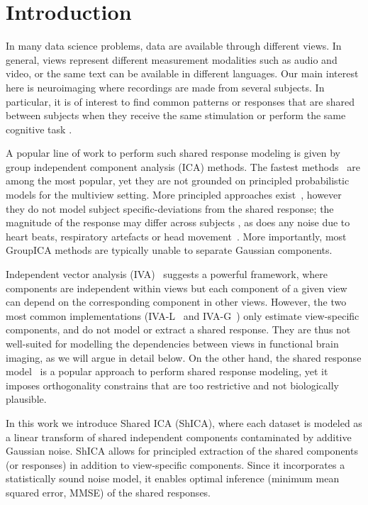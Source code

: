 \section{Introduction}
In many data science problems, data are available through different views. In general, views represent different measurement modalities such as audio and video, or the same text can be available in different languages. Our main interest here is neuroimaging where recordings are made from several subjects. In particular, it is of interest to find common patterns or responses that are shared between subjects when they receive the same stimulation or perform the same cognitive task \citep{chen2015reduced,richard2020modeling}. 

A popular line of work to perform such shared response modeling is given by group independent component analysis (ICA) methods. The fastest methods~\cite{calhoun2001method, varoquaux2009canica} are among the most popular, yet they are not grounded on principled probabilistic models for the multiview setting. 
%
More principled approaches exist~\cite{richard2020modeling, guo2008unified}, however they do not model subject specific-deviations from the shared response; the magnitude of the response may differ across subjects \cite{penny2007random}, as does any noise due to heart beats, respiratory artefacts or head movement~\cite{liu2016noise}.
%
More importantly, most GroupICA methods are typically unable to separate Gaussian components.

Independent vector analysis (IVA)~\cite{lee2008independent, anderson2011joint} suggests a powerful framework, where components are independent within views but each component of a given view can depend on the corresponding component in other views. 
%
However, the two most common implementations (IVA-L~\cite{lee2008independent} and IVA-G~\cite{anderson2011joint}) only estimate view-specific components, and do not model or extract a shared response. 
%
They are thus not well-suited for modelling the dependencies between views in functional brain imaging, as we will argue in detail below. On the other hand, the shared response model~\cite{chen2015reduced} is a popular approach to perform shared response modeling, yet it imposes orthogonality constrains that are too restrictive and not biologically plausible.

In this work we introduce Shared ICA (ShICA), where each dataset is modeled as a linear transform of shared independent components contaminated by additive Gaussian noise. ShICA allows for principled extraction of the shared components (or responses) in addition to view-specific components. 
%
Since it incorporates a statistically sound noise model, it enables optimal inference (minimum mean squared error, MMSE) of the shared responses.

